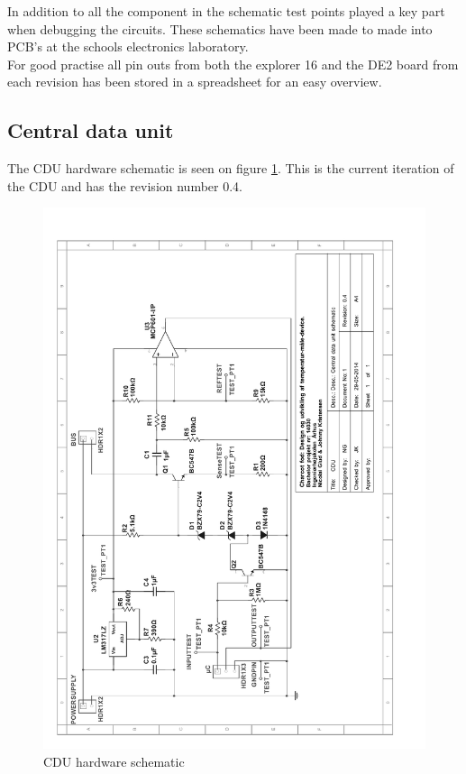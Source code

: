 In addition to all the component in the schematic test points played a key part when debugging the circuits. These schematics have been made to made into PCB's at the schools electronics laboratory.\\
For good practise all pin outs from both the explorer 16 and the DE2 board from each revision has been stored in a spreadsheet for an easy overview.
\subsection{Central data unit}
The CDU hardware schematic is seen on figure \ref{schematic:CDU}. This is the current iteration of the CDU and has the revision number 0.4.
\begin{figure}[H]
	\centering
	\includegraphics[width=1.1\textwidth]{billeder/11projectdescription/CDU_schematic_rotated}
	\caption{CDU hardware schematic}
	\label{schematic:CDU}
\end{figure}

